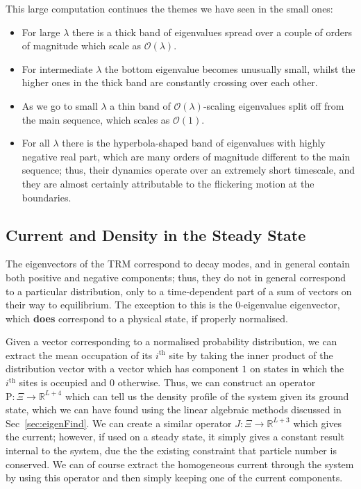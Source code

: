 This large computation continues the themes we have seen in the small ones:
\begin{itemize}
 \item For large $\lambda$ there is a thick band of eigenvalues spread over a couple
 of orders of magnitude which scale as $\mathcal{O}(\lambda)$.
 \item For intermediate $\lambda$ the bottom eigenvalue becomes unusually small, whilst
 the higher ones in the thick band are constantly crossing over each other.
 \item As we go to small $\lambda$ a thin band of $\mathcal{O}(\lambda)$-scaling
 eigenvalues split off from the main sequence, which scales as $\mathcal{O}(1)$.
 \item For all $\lambda$ there is the hyperbola-shaped band of eigenvalues with highly
 negative real part, which are many orders of magnitude different to the main sequence;
 thus, their dynamics operate over an extremely short timescale, and they are almost
 certainly attributable to the flickering motion at the boundaries.
\end{itemize}



\subsection{Current and Density in the Steady State}
The eigenvectors of the TRM correspond to decay modes, and in general contain both 
positive and negative components; thus, they do not in general correspond to a
particular distribution, only to a time-dependent part of a sum of vectors on their
way to equilibrium. The exception to this is the $0$-eigenvalue eigenvector, which
\textbf{does} correspond to a physical state, if properly normalised.

Given a vector corresponding to a normalised probability distribution, we can extract
the mean occupation of its $i^\mathrm{th}$ site by taking the inner product of the
distribution vector with a vector which has component $1$ on states in which the
$i^\mathrm{th}$ sites is occupied and $0$ otherwise. Thus, we can construct an operator
$\mathrm{P} : \Xi \rightarrow \mathbb{R}^{L+4}$ which can tell us the density profile of
the system given its ground state, which we can have found using the linear algebraic
methods discussed in Sec~\ref{sec:eigenFind}. We can create a similar operator
$J : \Xi \rightarrow \mathbb{R}^{L+3}$ which gives the current; however, if used on a 
steady state, it simply gives a constant result internal to the system, due the the
existing constraint that particle number is conserved. We can of course extract
the homogeneous current through the system by using this operator and then simply
keeping one of the current components.

